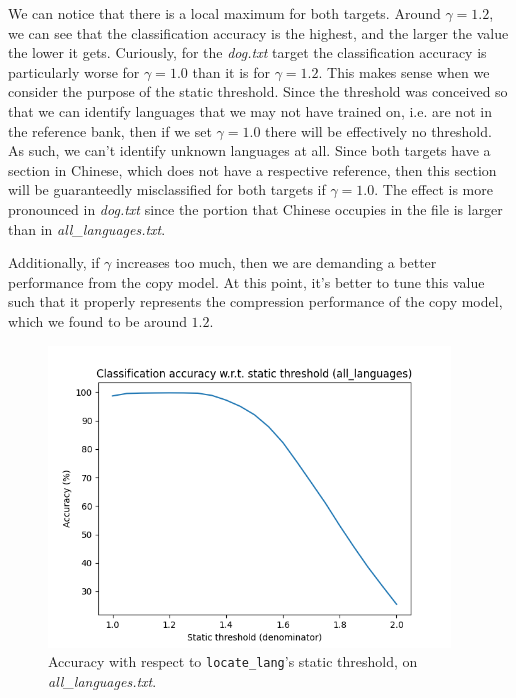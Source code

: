 \documentclass{article}
\begin{document}
We can notice that there is a local maximum for both targets.
Around $\gamma = 1.2$, we can see that the classification accuracy is the highest, and the larger the value the lower it gets.
Curiously, for the \textit{dog.txt} target the classification accuracy is particularly worse for $\gamma = 1.0$ than it is for $\gamma = 1.2$.
This makes sense when we consider the purpose of the static threshold.
Since the threshold was conceived so that we can identify languages that we may not have trained on, i.e. are not in the reference bank, then if we set $\gamma = 1.0$ there will be effectively no threshold.
As such, we can't identify unknown languages at all.
Since both targets have a section in Chinese, which does not have a respective reference, then this section will be guaranteedly misclassified for both targets if $\gamma = 1.0$.
The effect is more pronounced in \textit{dog.txt} since the portion that Chinese occupies in the file is larger than in \textit{all\_languages.txt}.

Additionally, if $\gamma$ increases too much, then we are demanding a better performance from the copy model.
At this point, it's better to tune this value such that it properly represents the compression performance of the copy model, which we found to be around $1.2$.

\begin{figure}
    \centering
    \includegraphics[width=0.95\textwidth]{../results/all_languages/ll-s.png}
    \caption{Accuracy with respect to \texttt{locate\_lang}'s static threshold, on \textit{all\_languages.txt}.}
    \label{fig:ll_s_all_languages}
\end{figure}
\end{document}
